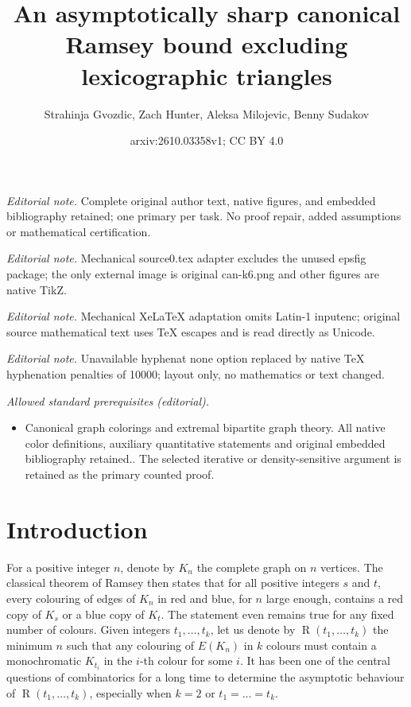 \documentclass[10pt,a4paper]{article}
\title{An asymptotically sharp canonical Ramsey bound excluding lexicographic triangles}
\author{Strahinja Gvozdic, Zach Hunter, Aleksa Milojevic, Benny Sudakov}
\date{arxiv:2610.03358v1; CC BY 4.0}
\theoremstyle{plain}
\theoremstyle{definition}
\begin{document}
\maketitle
\noindent\textit{Editorial note.} Complete original author text, native figures, and embedded bibliography retained; one primary per task. No proof repair, added assumptions or mathematical certification.\par\medskip
\noindent\textit{Editorial note.} Mechanical source0.tex adapter excludes the unused epsfig package; the only external image is original can-k6.png and other figures are native TikZ.\par\medskip
\noindent\textit{Editorial note.} Mechanical XeLaTeX adaptation omits Latin-1 inputenc; original source mathematical text uses TeX escapes and is read directly as Unicode.\par\medskip
\noindent\textit{Editorial note.} Unavailable hyphenat none option replaced by native TeX hyphenation penalties of 10000; layout only, no mathematics or text changed.\par\medskip
\noindent\textit{Allowed standard prerequisites (editorial).}\begin{itemize}
\item Canonical graph colorings and extremal bipartite graph theory. All native color definitions, auxiliary quantitative statements and original embedded bibliography retained.. The selected iterative or density-sensitive argument is retained as the primary counted proof.
\end{itemize}\medskip
\section{Introduction}\label{sec-intro}

For a positive integer $n$, denote by $K_n$ the complete graph on $n$ vertices. The classical theorem of Ramsey then states that for all positive integers $s$ and $t$, every colouring of edges of $K_n$ in red and blue, for $n$ large enough, contains a red copy of $K_s$ or a blue copy of $K_t$. The statement even remains true for any fixed number of colours. Given integers $t_1,\dots,t_k$, let us denote by $\operatorname{R}(t_1,\dots,t_k)$ the minimum $n$ such that any colouring of $E(K_n)$ in $k$ colours must contain a monochromatic $K_{t_i}$ in the $i$-th colour for some $i$. It has been one of the central questions of combinatorics for a long time to determine the asymptotic behaviour of $\operatorname{R}(t_1,\dots,t_k)$, especially when $k=2$ or $t_1=\dots=t_k$.
\end{document}
